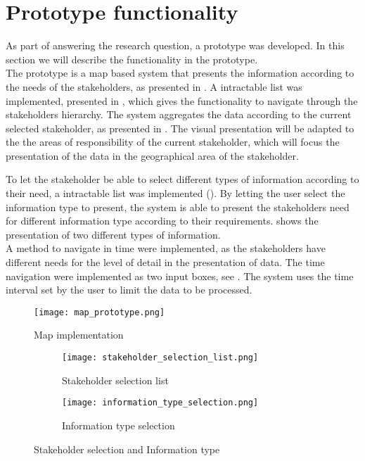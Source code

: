 
\section{Prototype functionality} %
\label{sec:prototype_functionality}
As part of answering the research question, a prototype was developed. In this
section we will describe the functionality in the prototype.\\

The prototype is a map based system that presents the information according to
the needs of the stakeholders, as presented in . A
intractable list was implemented, presented in ,
which gives the functionality to navigate through the stakeholders hierarchy.
The system aggregates the data according to the current selected stakeholder,
as presented in . The visual presentation will 
be adapted to the the areas of responsibility of the current stakeholder, 
which will focus the presentation of the data in the geographical area of the 
stakeholder.

To let the stakeholder be able to select different types of information
according to their need, a intractable list was implemented ().
By letting the user select the information type to present, the system is able
to present the stakeholders need for different information type according to
their requirements. 
shows the presentation of two different types of information.\\

A method to navigate in time were implemented, as the stakeholders have 
different needs for the level of detail in the presentation of data. The time
navigation were implemented as two input boxes, see .
The system uses the time interval set by the user to limit the data to be
processed. 

\begin{figure}[!htbp]
	\texttt{[image: map\_prototype.png]}
	\caption[Map implementation]{Map implementation}
	\label{fig:map_prototype}
\end{figure}

\begin{figure}[h!tbp]
	\centering
	\begin{subfigure}{0.4\textwidth}
		\texttt{[image: stakeholder\_selection\_list.png]}
		\caption[Stakeholder selection list]{Stakeholder selection list}
		\label{fig:stakeholder_selection_list}
	\end{subfigure}
	\begin{subfigure}{0.3\textwidth}
		\texttt{[image: information\_type\_selection.png]}
		\caption[Information type selection]{Information type selection}
		\label{fig:implementation_type_selection}
	\end{subfigure}
	\caption[Stakeholder selection and Information type]{Stakeholder selection and Information type}
	\label{fig:stakeholder_selection_and_information_type}
\end{figure}

